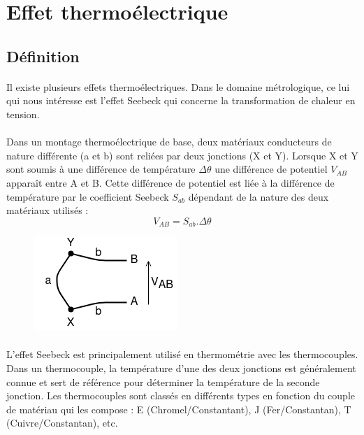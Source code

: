\documentclass{article}
\begin{document}
    \newpage
    \section{Effet thermoélectrique}

    \subsection{Définition}
    \paragraph{}
    Il existe plusieurs effets thermoélectriques. Dans le domaine métrologique, ce lui qui nous intéresse est l'effet Seebeck qui concerne la transformation de chaleur en tension.

    \paragraph{}
    Dans un montage thermoélectrique de base, deux matériaux conducteurs de nature différente (a et b) sont reliées par deux jonctions (X et Y). Lorsque X et Y sont soumis à une différence de température $\Delta \theta$ une différence de potentiel $V_{AB}$ apparaît entre A et B. Cette différence de potentiel est liée à la différence de température par le coefficient Seebeck $S_{ab}$ dépendant de la nature des deux matériaux utilisés : $$V_{AB} = S_{ab} . \Delta \theta$$

    \begin{figure}[H]
        \centering
        \includegraphics[width=0.2\linewidth]{./images/seedbeck.png}
    \end{figure}

    \paragraph{}
    L'effet Seebeck est principalement utilisé en thermométrie avec les thermocouples. Dans un thermocouple, la température d'une des deux jonctions est généralement connue et sert de référence pour déterminer la température de la seconde jonction. Les thermocouples sont classés en différents types en fonction du couple de matériau qui les compose : E (Chromel/Constantant), J (Fer/Constantan), T (Cuivre/Constantan), etc.
\end{document}
